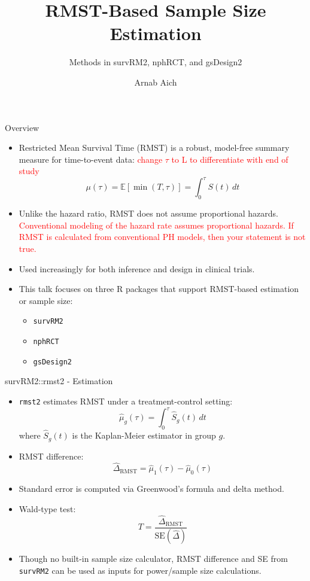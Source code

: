 \documentclass{beamer}
\title{RMST-Based Sample Size Estimation}
\subtitle{Methods in survRM2, nphRCT, and gsDesign2}
\author{Arnab Aich}
\institute{UTHSC-PM}
\begin{document}
\frame{\titlepage}

\begin{frame}{Overview}
\begin{itemize}
    \item Restricted Mean Survival Time (RMST) is a robust, model-free summary measure for time-to-event data: \textcolor{red}{change $\tau$ to L to differentiate with end of study}
    \[
    \mu(\tau) = \mathbb{E}[\min(T, \tau)] = \int_0^\tau S(t) \, dt
    \]
    \item Unlike the hazard ratio, RMST does not assume proportional hazards. \textcolor{red}{Conventional modeling of the hazard rate assumes proportional hazards. If RMST is calculated from conventional PH models, then your statement is not true.}
    \item Used increasingly for both inference and design in clinical trials.
    \item This talk focuses on three R packages that support RMST-based estimation or sample size:
    \begin{itemize}
        \item \texttt{survRM2}
        \item \texttt{nphRCT}
        \item \texttt{gsDesign2}
    \end{itemize}
\end{itemize}
\end{frame}

\begin{frame}{survRM2::rmst2 - Estimation}
\begin{itemize}
    \item \texttt{rmst2} estimates RMST under a treatment-control setting:
    \[
    \hat{\mu}_g(\tau) = \int_0^\tau \hat{S}_g(t) \, dt
    \]
    where $\hat{S}_g(t)$ is the Kaplan-Meier estimator in group $g$.
    
    \item RMST difference: 
    \[
    \hat{\Delta}_{\text{RMST}} = \hat{\mu}_1(\tau) - \hat{\mu}_0(\tau)
    \]
    
    \item Standard error is computed via Greenwood's formula and delta method.
    
    \item Wald-type test:
    \[
    T = \frac{\hat{\Delta}_{\text{RMST}}}{\text{SE}(\hat{\Delta})}
    \]
    
    \item Though no built-in sample size calculator, RMST difference and SE from \texttt{survRM2} can be used as inputs for power/sample size calculations.
\end{itemize}
\end{frame}
\end{document}
